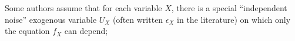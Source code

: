 Some authors assume that 
for each variable $X$, there is a special
``independent noise'' exogenous variable 
$U_X$
(often written $\epsilon_X$ in the literature)
on which only the equation $f_X$ can depend;
